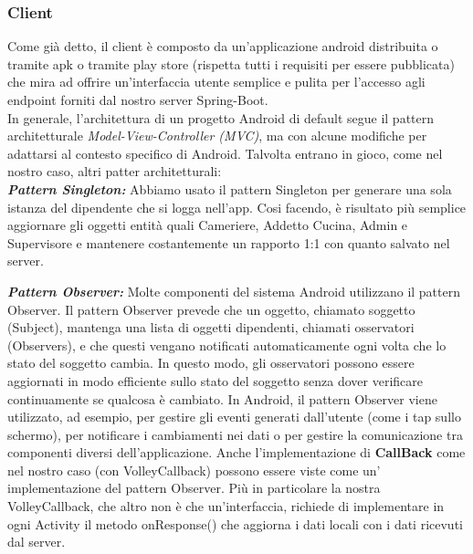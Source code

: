     \subsubsection{Client}
    \begin{flushleft}
        Come già detto, il client è composto da un'applicazione android distribuita o tramite apk o tramite play store (rispetta tutti i requisiti per essere pubblicata) che mira ad offrire un'interfaccia utente semplice e pulita 
        per l'accesso agli endpoint forniti dal nostro server Spring-Boot. \\
        In generale, l'architettura di un progetto Android di default segue il pattern architetturale \emph{Model-View-Controller (MVC)}, 
        ma con alcune modifiche per adattarsi al contesto specifico di Android. Talvolta entrano in gioco, come nel nostro caso, altri patter architetturali:\\
        \vspace{0.2cm}
        \textbf{\emph{Pattern Singleton:}} Abbiamo usato il pattern Singleton per generare una sola istanza del dipendente che si logga nell'app. 
        Cosi facendo, è risultato più semplice aggiornare gli oggetti entità quali Cameriere, Addetto Cucina, Admin e Supervisore e mantenere costantemente un rapporto 1:1 con quanto salvato nel server.\vspace{1cm}
        
        \textbf{\emph{Pattern Observer:}} Molte componenti del sistema Android utilizzano il pattern Observer. 
        Il pattern Observer prevede che un oggetto, chiamato soggetto (Subject), mantenga una lista di oggetti dipendenti, chiamati osservatori (Observers), 
        e che questi vengano notificati automaticamente ogni volta che lo stato del soggetto cambia. In questo modo, 
        gli osservatori possono essere aggiornati in modo efficiente sullo stato del soggetto senza dover verificare continuamente se qualcosa è cambiato.
        In Android, il pattern Observer viene utilizzato, ad esempio, per gestire gli eventi generati dall'utente (come i tap sullo schermo), per notificare i cambiamenti nei dati  o per gestire la comunicazione tra componenti diversi dell'applicazione.
        Anche l'implementazione di \textbf{CallBack} come nel nostro caso (con VolleyCallback) possono essere viste come un' implementazione del pattern Observer.
        Più in particolare la nostra VolleyCallback, che altro non è che un'interfaccia, richiede di implementare in ogni Activity il metodo onResponse() che aggiorna i dati locali con i dati ricevuti dal server.\vspace{1cm}
       

\end{flushleft}
